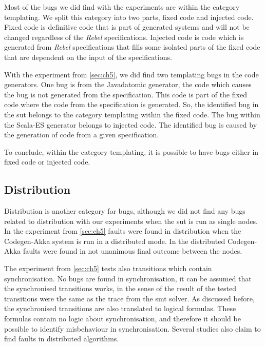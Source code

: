 Most of the bugs we did find with the experiments are within the category
templating. We split this category into two parts, fixed code and injected code.
Fixed code is definitive code that is part of generated systems and will not be
changed regardless of the \textit{Rebel} specifications.
Injected code is code which is generated from \textit{Rebel} specifications that
fills some isolated parts of the fixed code that are dependent on the input of
the specifications.

With the experiment from \autoref{sec:ch5}, we did find two templating bugs in the code
generators. One bug is from the Javadatomic generator, the code which causes the
bug is not generated from the specification. This code is part of the fixed code
where the code from the specification is generated. So, the identified bug in
the \gls{sut} belongs to the category templating within the fixed code.
The bug within the Scala-ES generator belongs to injected code. The identified bug is
caused by the generation of code from a given specification.

To conclude, within
the category templating, it is possible to have bugs either in fixed code or
injected code.


\subsection{Distribution}
Distribution is another category for bugs, although we did not find any bugs
related to distribution with our experiments when the \gls{sut} is run as single
nodes. In the experiment from \autoref{sec:ch5} faults were found in
distribution when the Codegen-Akka system is run in a distributed mode. In the
distributed Codegen-Akka faults were found in not unanimous final outcome
between the nodes.

The experiment from \autoref{sec:ch5} tests also transitions which contain
synchronisation. No bugs are found in synchronisation, it can be assumed that
the synchronised transitions works, in the sense of the result of the tested
transitions were the same as the trace from the \gls{smt} solver. As discussed
before, the synchronised transitions are also translated to logical formulas.
These formulas contain no logic about synchronisation, and therefore it should
be possible to identify misbehaviour in synchronisation. Several studies also
claim to find faults in distributed algorithms.
